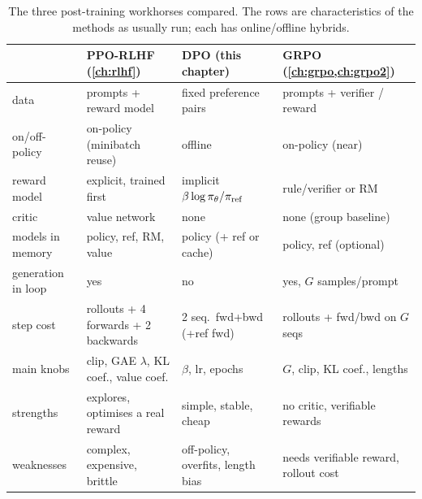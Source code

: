 \begin{table}[t]
\centering\small
\begin{tabularx}{\linewidth}{@{}lXXX@{}}
\toprule
 & \textbf{PPO-RLHF} (\cref{ch:rlhf}) & \textbf{DPO} (this chapter) & \textbf{GRPO} (\cref{ch:grpo,ch:grpo2})\\
\midrule
data & prompts + reward model & fixed preference pairs & prompts + verifier / reward\\
on/off-policy & on-policy (minibatch reuse) & offline & on-policy (near)\\
reward model & explicit, trained first & implicit $\beta\log\pi_\theta/\pi_{\text{ref}}$ & rule/verifier or RM\\
critic & value network & none & none (group baseline)\\
models in memory & policy, ref, RM, value & policy (+ ref or cache) & policy, ref (optional)\\
generation in loop & yes & no & yes, $G$ samples/prompt\\
step cost & rollouts + 4 forwards + 2 backwards & 2 seq.\ fwd+bwd (+ref fwd) & rollouts + fwd/bwd on $G$ seqs\\
main knobs & clip, GAE $\lambda$, KL coef., value coef. & $\beta$, lr, epochs & $G$, clip, KL coef., lengths\\
strengths & explores, optimises a real reward & simple, stable, cheap & no critic, verifiable rewards\\
weaknesses & complex, expensive, brittle & off-policy, overfits, length bias & needs verifiable reward, rollout cost\\
\bottomrule
\end{tabularx}
\caption{The three post-training workhorses compared. The rows are characteristics of the
methods as usually run; each has online/offline hybrids.}
\label{tab:dpo:compare}
\end{table}

